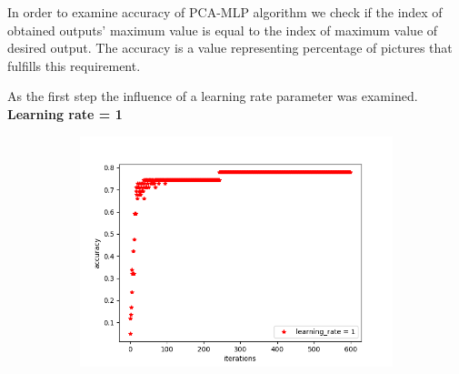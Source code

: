 In order to examine accuracy of PCA-MLP algorithm we check if the index of obtained outputs' maximum value is equal to the index of maximum value of desired output. The accuracy is a value representing percentage of pictures that fulfills this requirement.

As the first step the influence of a learning rate parameter was examined.\\
\textbf{Learning rate = 1}\\
\begin{figure}[H]
\centering
\begin{subfigure}[b]{.45\linewidth}
\includegraphics[width=\linewidth]{img/tests/20ppl/learnig_rate1_v1.png}
\end{subfigure}


\end{figure}
